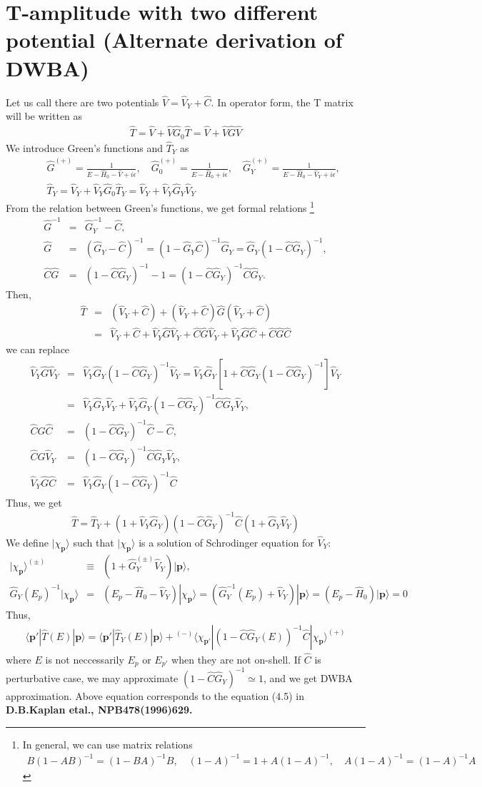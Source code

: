 \documentclass[10pt]{article}
\def\bm{\boldsymbol}
\newcommand{\bea}{\begin{eqnarray}}
\newcommand{\eea}{\end{eqnarray}}
\newcommand{\no}{\nonumber \\}
\def\vp{{\bm p}}
\def\la{\langle}
\def\ra{\rangle}
\begin{document}
\newpage
\section{T-amplitude with two different potential
(Alternate derivation of DWBA)
}
Let us call there are two potentials 
$\hat{V}=\hat{V}_Y+\hat{C}$.
In operator form, the T matrix will be written as
\bea
\hat{T}=\hat{V}+\hat{V}\hat{G}_0\hat{T}
       =\hat{V}+\hat{V}\hat{G}\hat{V} 
\eea
We introduce Green's functions and $\hat{T}_Y$ as
\bea
& &\hat{G}^{(+)}=\frac{1}{E-\hat{H}_0-\hat{V}+i\epsilon},\quad
\hat{G}^{(+)}_0=\frac{1}{E-\hat{H}_0+i\epsilon},\quad
\hat{G}^{(+)}_Y=\frac{1}{E-\hat{H}_0-\hat{V}_Y+i\epsilon},\no
& &\hat{T}_Y=\hat{V}_Y+\hat{V}_Y\hat{G}_0\hat{T}_Y
            =\hat{V}_Y+\hat{V}_Y\hat{G}_Y\hat{V}_Y  
\eea
From the relation between Green's functions, we get formal relations
\footnote{In general, we can use matrix relations 
\bea
B(1-AB)^{-1}=(1-BA)^{-1}B, \quad
(1-A)^{-1}=1+A(1-A)^{-1},\quad
A(1-A)^{-1}=(1-A)^{-1}A
\eea
}
\bea
\hat{G}^{-1}&=&\hat{G}_Y^{-1}-\hat{C},\no
\hat{G}&=&(\hat{G}_Y-\hat{C})^{-1}
        =(1-\hat{G}_Y\hat{C})^{-1}\hat{G}_Y
        =\hat{G}_Y(1-\hat{C}\hat{G}_Y)^{-1},\no
\hat{C}\hat{G}&=& (1-\hat{C}\hat{G}_Y)^{-1}-1
      =(1-\hat{C}\hat{G}_Y)^{-1}\hat{C}\hat{G}_Y.   
\eea
Then, 
\bea
\hat{T}&=&(\hat{V}_Y+\hat{C})
          +(\hat{V}_Y+\hat{C})\hat{G}(\hat{V}_Y+\hat{C})\no
       &=&\hat{V}_Y+\hat{C}
          +\hat{V}_Y\hat{G}\hat{V}_Y
          +\hat{C}\hat{G}\hat{V}_Y
          +\hat{V}_Y\hat{G}\hat{C}
          +\hat{C}\hat{G}\hat{C}
\eea
we can replace
\bea
\hat{V}_Y\hat{G}\hat{V}_Y
&=&\hat{V}_Y\hat{G}_Y(1-\hat{C}\hat{G}_Y)^{-1} \hat{V}_Y
 =\hat{V}_Y\hat{G}_Y[1+\hat{C}\hat{G}_Y(1-\hat{C}\hat{G}_Y)^{-1}]\hat{V}_Y
 \no
 &=&\hat{V}_Y\hat{G}_Y\hat{V}_Y
    +\hat{V}_Y\hat{G}_Y(1-\hat{C}\hat{G}_Y)^{-1}\hat{C}\hat{G}_Y\hat{V}_Y,\no
\hat{C}\hat{G}\hat{C}
     &=&   (1-\hat{C}\hat{G}_Y)^{-1}\hat{C}-\hat{C},\no 
\hat{C}\hat{G}\hat{V}_Y
 &=&(1-\hat{C}\hat{G}_Y)^{-1}\hat{C}\hat{G}_Y\hat{V}_Y,\no
\hat{V}_Y\hat{G}\hat{C}
     &=&\hat{V}_Y\hat{G}_Y(1-\hat{C}\hat{G}_Y)^{-1}\hat{C}
\eea
Thus, we get
\bea
\hat{T}=\hat{T}_Y+
(1+\hat{V}_Y\hat{G}_Y)(1-\hat{C}\hat{G}_Y)^{-1}\hat{C}
(1+\hat{G}_Y\hat{V}_Y)
\eea
We define $|\chi_\vp\ra$ such that $|\chi_\vp\ra$
is a solution of Schrodinger equation for $\hat{V}_Y$:
\bea
|\chi_\vp\ra^{(\pm)}&\equiv& (1+\hat{G}^{(\pm)}_Y\hat{V}_Y)|\vp\ra,\no
\hat{G}_Y(E_p)^{-1}|\chi_\vp\ra
&=&(E_p-\hat{H}_0-\hat{V}_Y)|\chi_\vp\ra
=(\hat{G}_Y^{-1}(E_p)+\hat{V}_Y)|\vp\ra=(E_p-\hat{H}_0)|\vp\ra=0
\eea
Thus,
\bea
\la \vp'|\hat{T}(E)|\vp\ra
=\la \vp'|\hat{T}_Y(E)|\vp\ra
 +{}^{(-)}\la \chi_{\vp'}|(1-\hat{C}\hat{G}_Y(E))^{-1}\hat{C}
  |\chi_{\vp}\ra^{(+)}
\eea
where $E$ is not neccessarily $E_p$ or $E_{p'}$ when they are not on-shell.
If $\hat{C}$ is perturbative case, we may approximate
$(1-\hat{C}\hat{G}_Y)^{-1}\simeq 1$, and we get 
DWBA approximation. Above equation corresponds to the equation (4.5) in {\bf D.B.Kaplan etal., NPB478(1996)629.}
\end{document}
